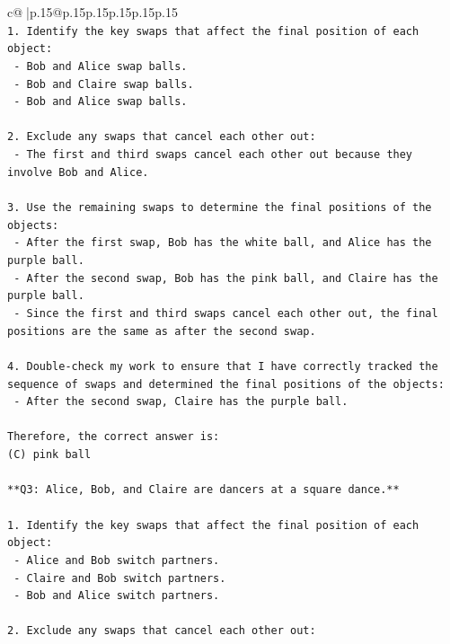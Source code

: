 \documentclass{article}
\begin{document}
{\begin{supertabular}{c@{$\;$}|p{.15\linewidth}@{}p{.15\linewidth}p{.15\linewidth}p{.15\linewidth}p{.15\linewidth}p{.15\linewidth}}
{{{\\ 
\texttt{1. Identify the key swaps that affect the final position of each object:} \\
\texttt{   {-} Bob and Alice swap balls.} \\
\texttt{   {-} Bob and Claire swap balls.} \\
\texttt{   {-} Bob and Alice swap balls.} \\
\\ 
\texttt{2. Exclude any swaps that cancel each other out:} \\
\texttt{   {-} The first and third swaps cancel each other out because they involve Bob and Alice.} \\
\\ 
\texttt{3. Use the remaining swaps to determine the final positions of the objects:} \\
\texttt{   {-} After the first swap, Bob has the white ball, and Alice has the purple ball.} \\
\texttt{   {-} After the second swap, Bob has the pink ball, and Claire has the purple ball.} \\
\texttt{   {-} Since the first and third swaps cancel each other out, the final positions are the same as after the second swap.} \\
\\ 
\texttt{4. Double{-}check my work to ensure that I have correctly tracked the sequence of swaps and determined the final positions of the objects:} \\
\texttt{   {-} After the second swap, Claire has the purple ball.} \\
\\ 
\texttt{Therefore, the correct answer is:} \\
\texttt{(C) pink ball} \\
\\ 
\texttt{**Q3: Alice, Bob, and Claire are dancers at a square dance.**} \\
\\ 
\texttt{1. Identify the key swaps that affect the final position of each object:} \\
\texttt{   {-} Alice and Bob switch partners.} \\
\texttt{   {-} Claire and Bob switch partners.} \\
\texttt{   {-} Bob and Alice switch partners.} \\
\\ 
\texttt{2. Exclude any swaps that cancel each other out:} \\
}}}
\end{supertabular}}
\end{document}
